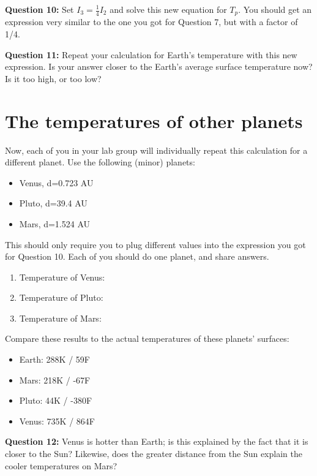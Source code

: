\documentclass[11pt]{article}
\def\BI{\begin{itemize}}
\def\EI{\end{itemize}}
\begin{document}
{\bf Question 10:} Set $I_3 = \frac{1}{4}I_2$ and solve this new equation for $T_p$. You should get an expression very similar to the one you got for Question 7, but with a factor of 1/4.

\vspace*{4cm}

\hrulefill

{\bf Question 11:} Repeat your calculation for Earth's temperature with this new expression. Is your answer closer to the Earth's average surface temperature now? Is it too high, or 
too low?

\vspace*{4cm}

\hrulefill

\newpage

\section*{The temperatures of other planets}

Now, each of you in your lab group will individually repeat this calculation for a different planet. Use the following (minor) planets:

\BI
\item Venus, d=0.723 AU
\item Pluto, d=39.4 AU 
\item Mars, d=1.524 AU 
\EI

This should only require you to plug different values into the expression you got for Question 10. Each of you should do one planet, and share answers. 

\begin{enumerate}

\item Temperature of Venus:
\bigskip
\item Temperature of Pluto:
\bigskip
\item Temperature of Mars:
\bigskip

\end{enumerate}

Compare these results to the actual
temperatures of these planets' surfaces:

\BI
\item Earth: 288K / 59F
\item Mars: 218K / -67F 
\item Pluto: 44K / -380F
\item Venus: 735K / 864F
\EI
\newpage
{\bf Question 12:} 
Venus is hotter than Earth; is this explained by the fact that it is closer to the Sun? Likewise, does the greater distance from the Sun explain the cooler temperatures on Mars?
\end{document}
